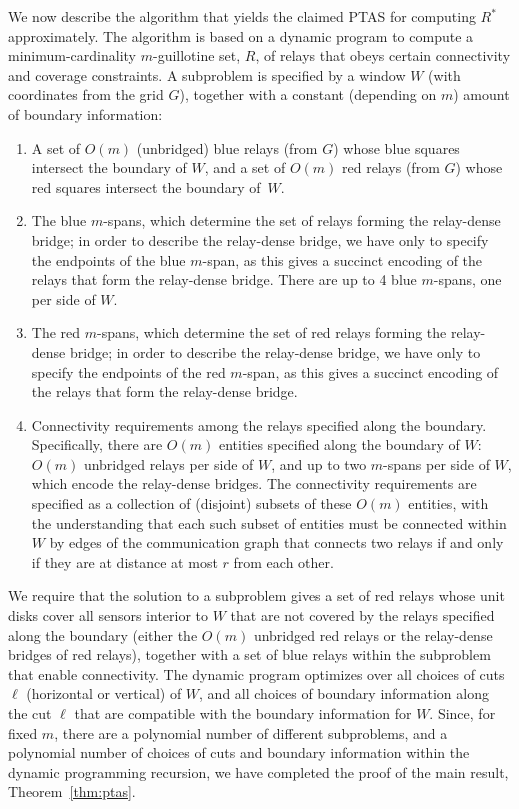 \documentclass[11pt,a4paper]{article}
\theoremstyle{definition}
\theoremstyle{remark}
\begin{document}
We now describe the algorithm that yields the claimed PTAS for
computing $R^*$ approximately.  The algorithm is based on a dynamic
program to compute a minimum-cardinality $m$-guillotine set, $R$, of
relays that obeys certain connectivity and coverage constraints.  A
subproblem is specified by a window $W$ (with coordinates from the
grid $G$), together with a constant (depending on $m$) amount of boundary information:
\begin{enumerate}
\item A set of $O(m)$ (unbridged) blue relays (from $G$) whose
  blue squares intersect the boundary of $W$, and a set of $O(m)$ red
  relays (from $G$) whose red squares intersect the boundary of~$W$.
\item The blue $m$-spans, which determine the set of relays
  forming the relay-dense bridge; in order to describe the relay-dense
  bridge, we have only to specify the endpoints of the blue $m$-span,
  as this gives a succinct encoding of the relays that form the
  relay-dense bridge.  There are up to 4 blue $m$-spans, one per side
  of $W$.
\item The red $m$-spans, which determine the set of red relays
  forming the relay-dense bridge; in order to describe the relay-dense
  bridge, we have only to specify the endpoints of the red $m$-span,
  as this gives a succinct encoding of the relays that form the
  relay-dense bridge.
\item Connectivity requirements among the relays specified along
  the boundary.  Specifically, there are $O(m)$ entities specified
  along the boundary of $W$: $O(m)$ unbridged relays per side of
  $W$, and up to two $m$-spans per side of $W$, which encode the
  relay-dense bridges.  The connectivity requirements are specified as
  a collection of (disjoint) subsets of these $O(m)$ entities, with
  the understanding that each such subset of entities must be
  connected within $W$ by edges of the communication graph that
  connects two relays if and only if they are at distance at most $r$
  from each other.
\end{enumerate}
We require that the solution to a subproblem gives a set of red relays
whose unit disks cover all sensors interior to $W$ that are not
covered by the relays specified along the boundary (either the $O(m)$
unbridged red relays or the relay-dense bridges of red relays),
together with a set of blue relays within the subproblem that enable
connectivity.  The dynamic program optimizes over all choices of cuts
$\ell$ (horizontal or vertical) of $W$, and all choices of boundary
information along the cut $\ell$ that are compatible with the boundary
information for $W$.  Since, for fixed $m$, there are a polynomial
number of different subproblems, and a polynomial number of choices of
cuts and boundary information within the dynamic programming
recursion, we have completed the proof of the main result, Theorem~\ref{thm:ptas}.
\end{document}
